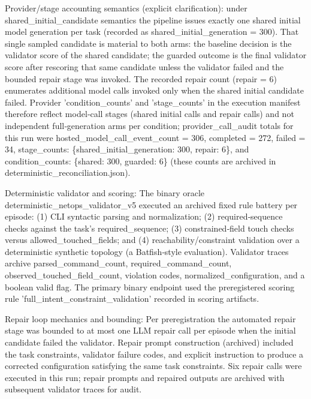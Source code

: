 \documentclass[conference]{IEEEtran}
\begin{document}
Provider/stage accounting semantics (explicit clarification): under shared\_initial\_candidate semantics the pipeline issues exactly one shared initial model generation per task (recorded as shared\_initial\_generation = 300). That single sampled candidate is material to both arms: the baseline decision is the validator score of the shared candidate; the guarded outcome is the final validator score after rescoring that same candidate unless the validator failed and the bounded repair stage was invoked. The recorded repair count (repair = 6) enumerates additional model calls invoked only when the shared initial candidate failed. Provider 'condition\_counts' and 'stage\_counts' in the execution manifest therefore reflect model‑call stages (shared initial calls and repair calls) and not independent full‑generation arms per condition; provider\_call\_audit totals for this run were hosted\_model\_call\_event\_count = 306, completed = 272, failed = 34, stage\_counts: \{shared\_initial\_generation: 300, repair: 6\}, and condition\_counts: \{shared: 300, guarded: 6\} (these counts are archived in deterministic\_reconciliation.json).

Deterministic validator and scoring: The binary oracle deterministic\_netops\_validator\_v5 executed an archived fixed rule battery per episode: (1) CLI syntactic parsing and normalization; (2) required‑sequence checks against the task's required\_sequence; (3) constrained‑field touch checks versus allowed\_touched\_fields; and (4) reachability/constraint validation over a deterministic synthetic topology (a Batfish‑style evaluation). Validator traces archive parsed\_command\_count, required\_command\_count, observed\_touched\_field\_count, violation codes, normalized\_configuration, and a boolean valid flag. The primary binary endpoint used the preregistered scoring rule 'full\_intent\_constraint\_validation' recorded in scoring artifacts.

Repair loop mechanics and bounding: Per preregistration the automated repair stage was bounded to at most one LLM repair call per episode when the initial candidate failed the validator. Repair prompt construction (archived) included the task constraints, validator failure codes, and explicit instruction to produce a corrected configuration satisfying the same task constraints. Six repair calls were executed in this run; repair prompts and repaired outputs are archived with subsequent validator traces for audit.
\end{document}
